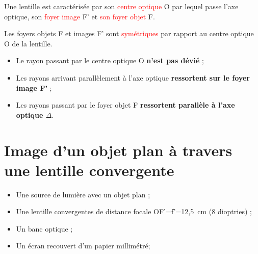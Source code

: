 \begin{multicols}{2}
\begin{tcolorbox}[colback=green!5!white,colframe=green!75!black,title=\textbf{Lentille convergente :}]  
    Une lentille est caractérisée par son \textcolor{red}{centre optique} O par lequel passe l'axe optique, son \textcolor{red}{foyer image} F' et \textcolor{red}{son foyer objet} F.
\end{tcolorbox}
\begin{tcolorbox}[colback=red!5!white,colframe=red!75!black,title=\textbf{Propriété sur F et F' :}]
Les foyers objets F et images F' sont \textcolor{red}{symétriques} par rapport au centre optique O de la lentille.
\end{tcolorbox}

\end{multicols}
    \begin{tcolorbox}[colback=red!5!white,colframe=red!75!black,title=\textbf{Règles de construction d'une image par une lentille :}]
\begin{itemize}
    \item Le rayon passant par le centre optique O \textbf{n'est pas dévié} ;
    \item Les rayons arrivant parallèlement à l'axe optique \textbf{ressortent sur le foyer image F'} ;
    \item Les rayons passant par le foyer objet F \textbf{ressortent parallèle à l'axe optique $\Delta$}.
\end{itemize}
\end{tcolorbox}
\newpage
\section{Image d'un objet plan à travers une lentille convergente}

\begin{mdframed}[style=autreexo]
\textbf{}
\vspace{-0.5cm}
\begin{multicols}{2}
\begin{itemize}
    \item Une source de lumière avec un objet plan ;
    \item Une lentille convergentes de distance focale OF'=f'=12,5~cm (8 dioptries) ;
    \item Un banc optique ;
    \item Un écran recouvert d'un papier millimétré;
\end{itemize}
\end{multicols}
\end{mdframed}

